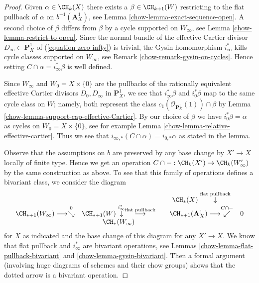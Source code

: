 \begin{proof}

Given $\alpha \in \CH_k(X)$ there exists a $\beta \in \CH_{k + 1}(W)$
restricting to the flat pullback of $\alpha$ on $b^{-1}(\mathbf{A}^1_X)$, see
Lemma \ref{chow-lemma-exact-sequence-open}.
A second choice of $\beta$ differs from $\beta$ by a cycle
supported on $W_\infty$, see
Lemma \ref{chow-lemma-restrict-to-open}. Since the normal bundle of the effective
Cartier divisor $D_\infty \subset \mathbf{P}^1_X$ of
(\ref{equation-zero-infty}) is trivial,
the Gysin homomorphism $i_\infty^*$ kills cycle classes
supported on $W_\infty$, see Remark \ref{chow-remark-gysin-on-cycles}.
Hence setting $C \cap \alpha = i_\infty^*\beta$ is well defined.

\medskip\noindent
Since $W_\infty$ and $W_0 = X \times \{0\}$
are the pullbacks of the rationally equivalent effective Cartier divisors
$D_0, D_\infty$ in $\mathbf{P}^1_X$, we see that $i_\infty^*\beta$ and
$i_0^*\beta$ map to the same cycle class on $W$; namely, both
represent the class $c_1(\mathcal{O}_{\mathbf{P}^1_X}(1)) \cap \beta$ by
Lemma \ref{chow-lemma-support-cap-effective-Cartier}. By our choice of
$\beta$ we have $i_0^*\beta = \alpha$ as cycles on
$W_0 = X \times \{0\}$, see for example
Lemma \ref{chow-lemma-relative-effective-cartier}.
Thus we see that $i_{\infty, *}(C \cap \alpha) = i_{0, *}\alpha$
as stated in the lemma.

\medskip\noindent
Observe that the assumptions on $b$ are preserved by any base change
by $X' \to X$ locally of finite type. Hence we get an operation
$C \cap - : \CH_k(X') \to \CH_k(W'_\infty)$ by the same construction as above.
To see that this family of operations defines a bivariant class,
we consider the diagram
$$
\begin{array}{ccccc} &  &  & \CH_*(X) \overset{\text{flat pullback}}{\downarrow} &  \\ \CH_{* + 1}(W_\infty) \longrightarrow\overset{0}{\searrow} & \CH_{* + 1}(W) \overset{i_\infty^*}{\downarrow}\overset{\text{flat pullback}}{\longrightarrow} &  & \CH_{* + 1}(\mathbf{A}^1_X) \longrightarrow\overset{C \cap -}{\swarrow} & 0 \\  & \CH_*(W_\infty) &  &  & \end{array}
$$
for $X$ as indicated and the base change of this diagram for any $X' \to X$.
We know that flat pullback and $i_\infty^*$ are bivariant operations, see
Lemmas \ref{chow-lemma-flat-pullback-bivariant} and \ref{chow-lemma-gysin-bivariant}.
Then a formal argument (involving huge diagrams of schemes and their
chow groups) shows that the dotted arrow is a bivariant operation.
\end{proof}

